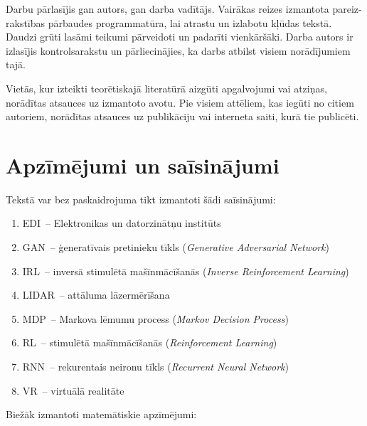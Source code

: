 \documentclass[12pt, a4paper]{article}
\numberwithin{equation}{section} %
\begin{document}
Darbu pārlasījis gan autors, gan darba vadītājs. Vairākas reizes izmantota pareiz-rakstības pārbaudes programmatūra, lai atrastu un izlabotu kļūdas tekstā. Daudzi grūti lasāmi teikumi pārveidoti un padarīti vienkāršāki. Darba autors ir izlasījis kontrolsarakstu un pārliecinājies, ka darbs atbilst visiem norādījumiem tajā.

Vietās, kur izteikti teorētiskajā literatūrā aizgūti apgalvojumi vai atziņas, norādītas atsauces uz izmantoto avotu. Pie visiem attēliem, kas iegūti no citiem autoriem, norādītas atsauces uz publikāciju vai interneta saiti, kurā tie publicēti.



\newpage

\tableofcontents
\thispagestyle{empty}
\newpage
\setcounter{page}{7}

\section*{Apzīmējumi un saīsinājumi}

Tekstā var bez paskaidrojuma tikt izmantoti šādi saīsinājumi:

\begin{enumerate}
    \item EDI~-- Elektronikas un datorzinātņu institūts
    \item GAN~-- ģeneratīvais pretinieku tīkls (\textit{Generative Adversarial Network})
    \item IRL~-- inversā stimulētā mašīnmācīšanās (\textit{Inverse Reinforcement Learning})
    \item LIDAR~-- attāluma lāzermērīšana
    \item MDP~-- Markova lēmumu process (\textit{Markov Decision Process})
    \item RL~-- stimulētā mašīnmācīšanās (\textit{Reinforcement Learning})
    \item RNN~-- rekurentais neironu tīkls (\textit{Recurrent Neural Network})
    \item VR~-- virtuālā realitāte
\end{enumerate}

Biežāk izmantoti matemātiskie apzīmējumi:
\end{document}
